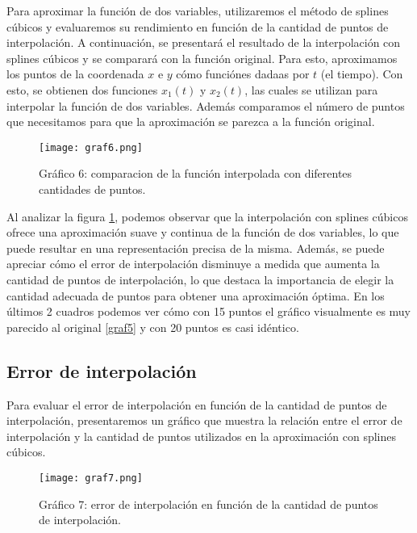 \documentclass[12pt,a4]{article} %
\begin{document}
\begin{multicols}{2}
Para aproximar la función de dos variables, utilizaremos el método de splines cúbicos y evaluaremos su rendimiento en función de la cantidad de puntos de interpolación. A continuación, se presentará el resultado de la interpolación con splines cúbicos y se comparará con la función original. Para esto, aproximamos los puntos de la coordenada $x$ e $y$ cómo funciónes dadaas por $t$ (el tiempo). Con esto, se obtienen dos funciones $x_1(t)$ y $x_2(t)$, las cuales se utilizan para interpolar la función de dos variables. Además comparamos el número de puntos que necesitamos para que la aproximación se parezca a la función original.

\begin{figure}[H] 
    \centering
    \texttt{[image: graf6.png]}
    \caption{Gráfico 6: comparacion de la función interpolada con diferentes cantidades de puntos.}
    \label{graf6}
\end{figure}

Al analizar la figura \ref{graf6}, podemos observar que la interpolación con splines cúbicos ofrece una aproximación suave y continua de la función de dos variables, lo que puede resultar en una representación precisa de la misma. Además, se puede apreciar cómo el error de interpolación disminuye a medida que aumenta la cantidad de puntos de interpolación, lo que destaca la importancia de elegir la cantidad adecuada de puntos para obtener una aproximación óptima. En los últimos 2 cuadros podemos ver cómo con 15 puntos el gráfico visualmente es muy parecido al original \ref{graf5} y con 20 puntos es casi idéntico.

\subsection{Error de interpolación}

Para evaluar el error de interpolación en función de la cantidad de puntos de interpolación, presentaremos un gráfico que muestra la relación entre el error de interpolación y la cantidad de puntos utilizados en la aproximación con splines cúbicos.

\begin{figure}[H] 
    \centering
    \texttt{[image: graf7.png]}
    \caption{Gráfico 7: error de interpolación en función de la cantidad de puntos de interpolación.}
    \label{graf7}
\end{figure}


\end{multicols}
\end{document}
